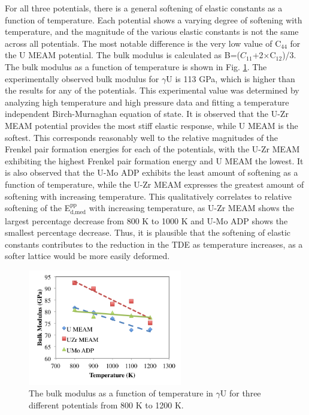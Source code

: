 \documentclass[review]{elsarticle}
\begin{document}
\FloatBarrier

For all three potentials, there is a general softening of elastic constants as a function of temperature. Each potential shows a varying degree of softening with temperature, and the magnitude of the various elastic constants is not the same across all potentials. The most notable difference is the very low value of C$_{44}$ for the U MEAM potential. The bulk modulus is calculated as B=($C_{11}$+2$\times$C$_{12}$)/3. The bulk modulus as a function of temperature is shown in Fig. \ref{fig:bulk}. The experimentally observed bulk modulus for $\gamma$U is 113 GPa\cite{yoo1998}, which is higher than the results for any of the potentials. This experimental value was determined by analyzing high temperature and high pressure data and fitting a temperature independent Birch-Murnaghan equation of state. It is observed that the U-Zr MEAM potential provides the most stiff elastic response, while U MEAM is the softest. This corresponds reasonably well to the relative magnitudes of the Frenkel pair formation energies for each of the potentials, with the U-Zr MEAM exhibiting the highest Frenkel pair formation energy and U MEAM the lowest. It is also observed that the U-Mo ADP exhibits the least amount of softening as a function of temperature, while the U-Zr MEAM expresses the greatest amount of softening with increasing temperature. This qualitatively correlates to relative softening of the E$^{\textrm{pp}}_{\textrm{d,med}}$ with increasing temperature, as U-Zr MEAM shows the largest percentage decrease from 800 K to 1000 K and U-Mo ADP shows the smallest percentage decrease. Thus, it is plausible that the softening of elastic constants contributes to the reduction in the TDE as temperature increases, as a softer lattice would be more easily deformed. 

\begin{figure}[h]
 \centering
 \includegraphics[width=0.6\textwidth]{bulk_vs_Tb.png} 
 \caption{The bulk modulus as a function of temperature in $\gamma$U for three different potentials from 800 K to 1200 K.}
 \label{fig:bulk}
\end{figure}
\end{document}
